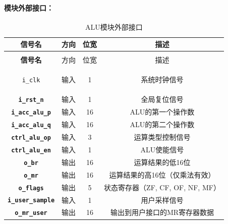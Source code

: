 \documentclass[lang=cn,a4paper,newtx]{elegantpaper}
\begin{document}
\paragraph{模块外部接口：}
\begin{longtable}{>{\bfseries}c c c c}
  \caption{ALU模块外部接口} \\ 
  \toprule
  信号名 & 方向 & 位宽 & 描述 \\ 
  \midrule
  \endfirsthead

  \multicolumn{4}{l}{\textbf{（续表）ALU模块外部接口}} \\ 
  \toprule
  信号名 & 方向 & 位宽 & 描述 \\ 
  \midrule
  \endhead

  \texttt{i\_clk} & 输入 & 1 & 系统时钟信号 \\ 
  \texttt{i\_rst\_n} & 输入 & 1 & 全局复位信号 \\ 
  \texttt{i\_acc\_alu\_p} & 输入 & 16 & ALU的第一个操作数 \\ 
  \texttt{i\_acc\_alu\_q} & 输入 & 16 & ALU的第二个操作数 \\ 
  \texttt{ctrl\_alu\_op} & 输入 & 3 & 运算类型控制信号 \\ 
  \texttt{ctrl\_alu\_en} & 输入 & 1 & ALU使能信号 \\ 
  \texttt{o\_br} & 输出 & 16 & 运算结果的低16位 \\ 
  \texttt{o\_mr} & 输出 & 16 & 运算结果的高16位（仅乘法有效） \\ 
  \texttt{o\_flags} & 输出 & 5 & 状态寄存器（ZF, CF, OF, NF, MF） \\ 
  \texttt{i\_user\_sample} & 输入 & 1 & 用户采样信号 \\ 
  \texttt{o\_mr\_user} & 输出 & 16 & 输出到用户接口的MR寄存器数据 \\ 
  \bottomrule
\end{longtable}
\end{document}
